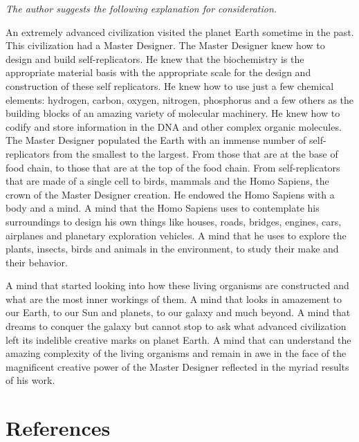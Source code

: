 \textit{The author suggests the following explanation for
consideration.}

An extremely advanced civilization visited the planet Earth sometime in
the past. This civilization had a Master Designer.  The Master Designer
knew how to design and build self-replicators. He knew that the
biochemistry is the appropriate material basis with the appropriate
scale for the design and construction of these self replicators. He
knew how to use just a few chemical elements: hydrogen, carbon, oxygen,
nitrogen, phosphorus and a few others as the building blocks of an
amazing variety of molecular machinery. He knew how to codify and store
information in the DNA and other complex organic molecules. The Master
Designer populated the Earth with an immense number of self-replicators
from the smallest to the largest. From those that are at the base of
food chain, to those that are at the top of the food chain. From
self-replicators that are made of a single cell to birds, mammals and
the Homo Sapiens, the crown of the Master Designer creation.  He
endowed the Homo Sapiens with a body and a mind. A mind that the Homo
Sapiens uses to contemplate his surroundings to design his own things
like houses, roads, bridges, engines, cars, airplanes and planetary
exploration vehicles. A mind that he uses to explore the plants,
insects, birds and animals in the environment, to study their make and
their behavior.

A mind that started looking into how these living organisms are
constructed and what are the most inner workings of them. A mind that
looks in amazement to our Earth, to our Sun and planets, to our galaxy
and much beyond. A mind that dreams to conquer the galaxy but cannot
stop to ask what advanced civilization left its indelible creative
marks on planet Earth. A mind that can understand the amazing
complexity of the living organisms and remain in awe in the face of the
magnificent creative power of the Master Designer reflected in the
myriad results of his work.


\section{References}

